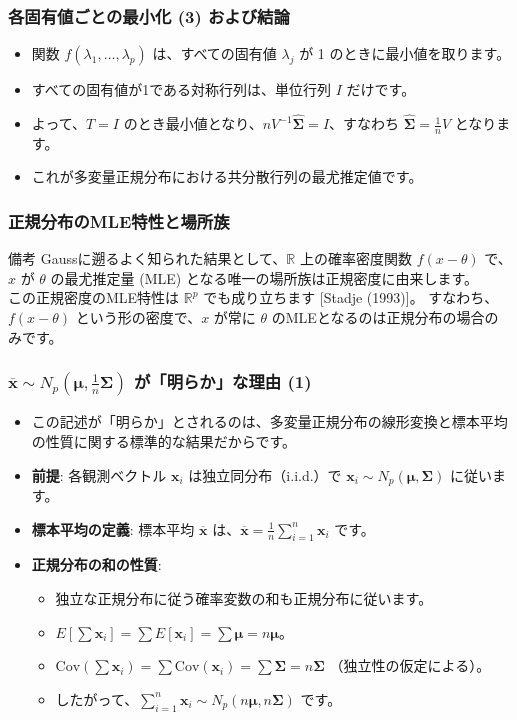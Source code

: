 \documentclass[aspectratio=169]{beamer}
\begin{document}
\begin{frame}
\frametitle{各固有値ごとの最小化 (3) および結論}
\begin{itemize}
    \item 関数 $f(\lambda_1,\dots,\lambda_p)$ は、すべての固有値 $\lambda_j$ が 1 のときに最小値を取ります。
    \item すべての固有値が1である対称行列は、単位行列 $I$ だけです。
    \item よって、$T = I$ のとき最小値となり、$nV^{-1}\hat{\bm{\Sigma}} = I$、すなわち $\hat{\bm{\Sigma}} = \frac{1}{n}V$ となります。
    \item これが多変量正規分布における共分散行列の最尤推定値です。
\end{itemize}
\end{frame}

\begin{frame}
\frametitle{正規分布のMLE特性と場所族}
\begin{block}{備考}
Gaussに遡るよく知られた結果として、$\mathbb{R}$ 上の確率密度関数 $f(x-\theta)$ で、$x$ が $\theta$ の最尤推定量 (MLE) となる唯一の場所族は正規密度に由来します。\\
この正規密度のMLE特性は $\mathbb{R}^p$ でも成り立ちます [Stadje (1993)]。
すなわち、$f(x-\theta)$ という形の密度で、$x$ が常に $\theta$ のMLEとなるのは正規分布の場合のみです。
\end{block}
\end{frame}

\begin{frame}
\frametitle{$\overline{\bm{x}}\sim N_{p}(\bm{\mu},\frac{1}{n}\bm{\Sigma})$ が「明らか」な理由 (1)}
\begin{itemize}
    \item この記述が「明らか」とされるのは、多変量正規分布の線形変換と標本平均の性質に関する標準的な結果だからです。
    \item \textbf{前提}: 各観測ベクトル $\bm{x}_i$ は独立同分布（i.i.d.）で $\bm{x}_i\sim N_{p}(\bm{\mu},\bm{\Sigma})$ に従います。
    \item \textbf{標本平均の定義}: 標本平均 $\overline{\bm{x}}$ は、$\overline{\bm{x}}=\frac{1}{n}\sum_{i=1}^{n}\bm{x}_i$ です。
    \item \textbf{正規分布の和の性質}:
    \begin{itemize}
        \item 独立な正規分布に従う確率変数の和も正規分布に従います。
        \item $E[\sum\bm{x}_i]=\sum E[\bm{x}_i]=\sum\bm{\mu}=n\bm{\mu}$。
        \item $\text{Cov}(\sum\bm{x}_i)=\sum\text{Cov}(\bm{x}_i)=\sum\bm{\Sigma}=n\bm{\Sigma}$ （独立性の仮定による）。
        \item したがって、$\sum_{i=1}^{n}\bm{x}_i\sim N_{p}(n\bm{\mu},n\bm{\Sigma})$ です。
    \end{itemize}
\end{itemize}
\end{frame}
\end{document}
